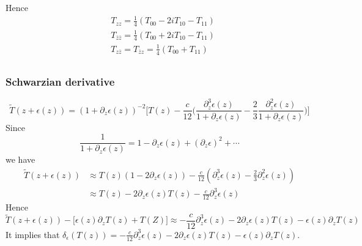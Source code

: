 \documentclass[11pt,a4paper]{article}
\theoremstyle{definition}
\begin{document}
	Hence 
	\[
	\begin{aligned}
	&T_{zz} = \frac{1}{4} (T_{00} - 2i T_{10} - T_{11})\\
	&T_{\bar{z} \bar{z}} = \frac{1}{4} (T_{00} +2i T_{10} - T_{11})\\
	&T_{z\bar{z}} =T_{\bar{z}z}= \frac{1}{4} (T_{00} + T_{11})\\
	\end{aligned}
	\]
\subsubsection{Schwarzian derivative}
\[
\tilde{T}(z+\epsilon(z)) = (1+ \partial_z \epsilon(z))^{-2}\Big[T(z)- \frac{c}{12}\big(\frac{\partial_z^3\epsilon(z)}{1+\partial_z\epsilon(z)}-\frac{2}{3} \frac{\partial_z^2 \epsilon(z)}{1+\partial_z \epsilon(z)}\big)\Big]
\]
Since 
\[
\frac{1}{1+\partial_z \epsilon(z)} = 1- \partial_z \epsilon(z) + (\partial_z \epsilon)^2 + \cdots
\]
we have 
\[
\begin{aligned}
\tilde{T}(z+ \epsilon(z)) &\approx T(z)(1-2\partial_z \epsilon(z)) - \frac{c}{12} (\partial^3_z \epsilon(z) - \frac{2}{3} \partial^2_z \epsilon(z))\\
& \approx T(z) - 2 \partial_z\epsilon(z) T(z) - \frac{c}{12}\partial^3_z\epsilon(z)
\end{aligned}
\]
Hence
\[
\tilde{T}(z+ \epsilon(z)) - \big[\epsilon(z)\partial_z T(z) +T(Z)\big] \approx -\frac{c}{12} \partial^3_z\epsilon(z) - 2 \partial_z\epsilon(z)T(z) -\epsilon(z)\partial_z T(z) 
\]
It implies that $\delta_\epsilon(T(z)) = -\frac{c}{12} \partial^3_z\epsilon(z) - 2 \partial_z\epsilon(z)T(z) -\epsilon(z)\partial_z T(z) $.
\end{document}
